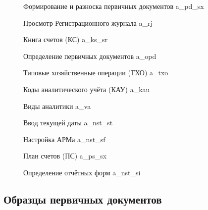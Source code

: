 \begin{figure}[h!]
    \centering
    \caption{Формирование и разноска первичных документов \gpiFIO\/a\_pd\_sx}
\end{figure}

\begin{figure}[h!]
    \centering
    \caption{Просмотр Регистрационного журнала \gpiFIO\/a\_rj}
\end{figure}

\begin{figure}[h!]
    \centering
    \caption{Книга счетов (КС) \gpiFIO\/a\_ks\_sr}
\end{figure}

\begin{figure}[h!]
    \centering
    \caption{Определение первичных документов \gpiFIO\/a\_opd}
\end{figure}

\begin{figure}[h!]
    \centering
    \caption{Типовые хозяйственные операции (ТХО) \gpiFIO\/a\_txo}
\end{figure}

\begin{figure}[h!]
    \centering
    \caption{Коды аналитического учёта (КАУ) \gpiFIO\/a\_kau}
\end{figure}

\begin{figure}[h!]
    \centering
    \caption{Виды аналитики \gpiFIO\/a\_va}
\end{figure}

\begin{figure}[h!]
    \centering
    \caption{Ввод текущей даты \gpiFIO\/a\_nst\_st}
\end{figure}

\begin{figure}[h!]
    \centering
    \caption{Настройка АРМа \gpiFIO\/a\_nst\_sf}
\end{figure}

\begin{figure}[h!]
    \centering
    \caption{План счетов (ПС) \gpiFIO\/a\_ps\_sx}
\end{figure}

\begin{figure}[h!]
    \centering
    \caption{Определение отчётных форм \gpiFIO\/a\_nst\_si}
\end{figure}

\newpage

\subsection{Образцы первичных документов}

